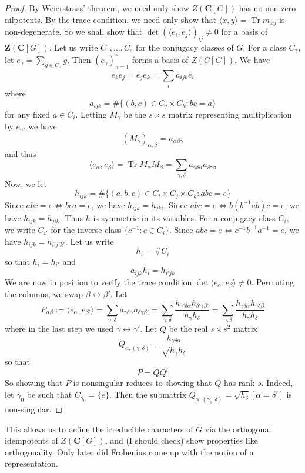 \documentclass[12pt]{article}
\newcommand{\gen}[1]{\langle#1\rangle}
\DeclareMathOperator{\trace}{Tr}
\newcommand{\C}{\mathbf{C}}
\newcommand{\Z}{\mathbf{Z}}
\begin{document}
\begin{proof}
By Weierstrass' theorem, we need only show $Z(\C[G])$ has no non-zero nilpotents. 
By the trace condition, we need only show that $\gen{x,y} = \trace m_{xy}$ is non-degenerate. 
So we shall show that $\det \left(\gen{e_i, e_j}\right)_{ij} \neq 0$ for a basis of $\Z(\C[G])$. 
Let us write $C_1,\dots,C_s$ for the conjugacy classes of $G$.
For a class $C_\gamma$, let $e_\gamma = \sum_{g\in C_\gamma} g$. 
Then $(e_\gamma)_{\gamma=1}^{s}$ forms a basis of $Z(C[G])$. 
We have 
\[ e_k e_j = e_j e_k = \sum_i a_{ijk} e_i\]
where 
\[a_{ijk} = \#\{(b,c)\in C_j\times C_k : bc = a\}\]
for any fixed $a\in C_i$. Letting $M_\gamma$ be the $s\times s$ matrix representing multiplication by $e_\gamma$, we have 
\[\left(M_\gamma\right)_{\alpha,\beta} = a_{\alpha\beta\gamma}\]
and thus
\[\gen{e_\alpha,e_\beta} = \trace M_{\alpha}M_\beta = \sum_{\gamma,\delta} a_{\gamma\delta \alpha}a_{\delta\gamma\beta}\]
Now, we let
\[ h_{ijk} = \#\{(a,b,c)\in C_i\times C_j\times C_k : abc = e\} \]
Since $abc=e\iff bca=e$, we have $h_{ijk}=h_{jki}$. Since $abc=e\iff b(b^{-1}ab)c=e$, we have $h_{ijk}=h_{jik}$. Thus $h$ is symmetric in its variables.
For a conjugacy class $C_i$, we write $C_{i'}$ for the inverse class $\{c^{-1} : c\in C_i\}$. Since $abc=e\iff c^{-1}b^{-1}a^{-1}=e$, we have $h_{ijk}=h_{i'j'k'}$. Let us write \[h_i = \# C_i\]
so that $h_i=h_{i'}$ and
\[ a_{ijk}h_i = h_{i'jk} \]
We are now in position to verify the trace condition $\det \gen{e_\alpha,e_\beta} \neq 0$. Permuting the columns, we swap $\beta\leftrightarrow \beta'$. 
Let
\[ P_{\alpha \beta} := \gen{e_\alpha, e_{\beta'}} = \sum_{\gamma,\delta} a_{\gamma\delta\alpha}a_{\delta\gamma\beta'} = \sum_{\gamma,\delta} \frac{h_{\gamma'\delta\alpha} h_{\delta'\gamma\beta'}}{h_\gamma h_\delta} = \sum_{\gamma,\delta} \frac{h_{\gamma\delta\alpha} h_{\gamma\delta\beta}}{h_\gamma h_\delta}\]
where in the last step we used $\gamma\leftrightarrow \gamma'$. 
Let $Q$ be the real $s\times s^2$ matrix 
\[ Q_{\alpha,(\gamma,\delta)} = 
\frac{h_{\gamma\delta\alpha}}{{\sqrt{h_\gamma h_\delta}}}\]
so that \[P=QQ^t\]
So showing that $P$ is nonsingular reduces to showing that $Q$ has rank $s$. Indeed, let $\gamma_0$ be such that $C_{\gamma_0} = \{e\}$. Then the submatrix $Q_{\alpha,(\gamma_0,\delta)} = \sqrt{h_\delta} [\alpha=\delta']$
is non-singular.
\end{proof}


This allows us to define the irreducible characters of $G$ via the orthogonal idempotents of $Z(\C[G])$, and (I should check) show properties like orthogonality. Only later did Frobenius come up with the notion of a representation.
\end{document}
